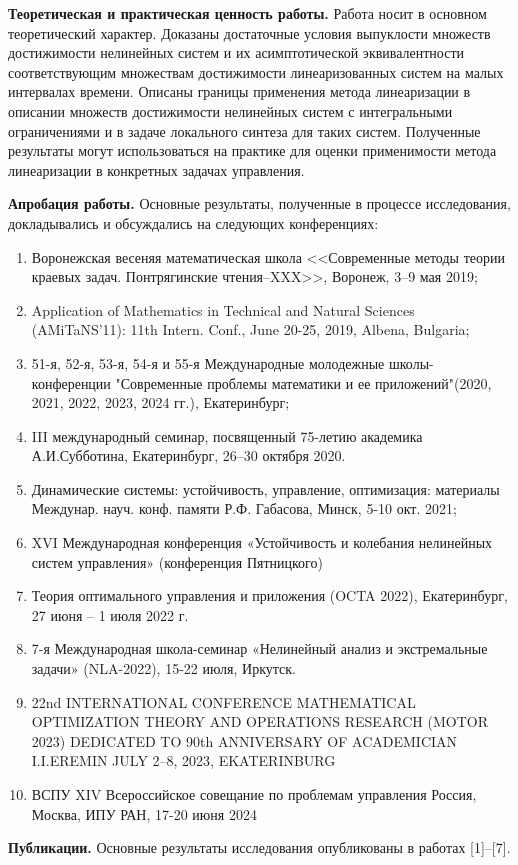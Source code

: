 \documentclass[../main.tex]{subfiles}
\begin{document}
\textbf{Теоретическая и практическая ценность работы.} Работа носит в основном теоретический характер. Доказаны достаточные условия выпуклости множеств достижимости нелинейных систем и их асимптотической эквивалентности соответствующим множествам достижимости линеаризованных систем на малых интервалах времени. Описаны границы применения метода линеаризации в описании множеств достижимости нелинейных систем с интегральными ограничениями и в задаче локального синтеза для таких систем. Полученные результаты могут использоваться на практике для оценки применимости метода линеаризации в конкретных задачах управления.
	
\textbf{Апробация работы.}  Основные результаты, полученные в процессе исследования, докладывались и обсуждались на следующих конференциях:
\begin{enumerate}
	\item Воронежская весеняя математическая школа <<Современные методы теории краевых задач. Понтрягинские чтения–XXX>>, Воронеж, 3–9 мая 2019;
	\item Application of Mathematics in Technical and Natural Sciences (AMiTaNS’11): 11th Intern. Conf., June 20-25, 2019, Albena, Bulgaria;
	\item 51-я, 52-я, 53-я, 54-я и 55-я Международные молодежные школы-конференции "Современные проблемы математики и ее приложений"(2020, 2021, 2022, 2023, 2024 гг.), Екатеринбург;
	\item III международный семинар, посвященный 75-летию академика А.И.Субботина, Екатеринбург, 26–30 октября 2020.
	\item Динамические системы: устойчивость, управление, оптимизация: материалы Междунар. науч. конф. памяти Р.Ф. Габасова, Минск, 5-10 окт. 2021;
	\item XVI Международная конференция «Устойчивость и колебания нелинейных систем управления» (конференция Пятницкого) 
	\item Теория оптимального управления и приложения (OCTA 2022),
Екатеринбург, 27 июня – 1 июля 2022 г.
	\item 7-я Международная школа-семинар  «Нелинейный анализ и экстремальные задачи» (NLA-2022), 15-22 июля, Иркутск.
	\item 22nd INTERNATIONAL CONFERENCE MATHEMATICAL OPTIMIZATION THEORY AND OPERATIONS RESEARCH
	(MOTOR 2023) DEDICATED TO 90th ANNIVERSARY OF ACADEMICIAN I.I.EREMIN JULY 2–8, 2023, EKATERINBURG
	\item ВСПУ  XIV Всероссийское совещание по проблемам управления Россия, Москва, ИПУ РАН, 17-20 июня 2024
\end{enumerate}
	
\textbf{Публикации.} Основные результаты исследования опубликованы в работах [1]--[7].
\end{document}

